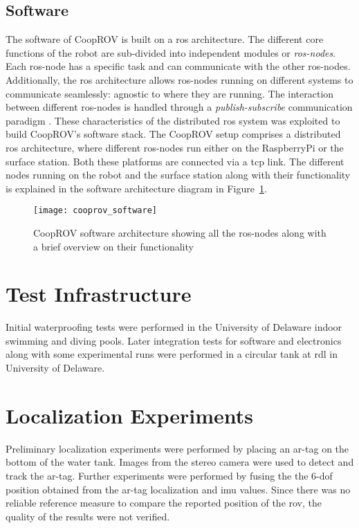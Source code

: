 \subsection{Software}

The software of CoopROV is built on a \gls{ros} architecture. The different core functions of the robot are sub-divided into independent modules or \emph{\gls{ros}-nodes}. Each \gls{ros}-node has a specific task and can communicate with the other \gls{ros}-nodes. Additionally, the \gls{ros} architecture allows \gls{ros}-nodes running on different systems to communicate seamlessly: agnostic to where they are running. The interaction between different \gls{ros}-nodes is handled through a \emph{publish-subscribe} communication paradigm \cite{eugster}. These characteristics of the distributed \gls{ros} system was exploited to build CoopROV's software stack. The CoopROV setup comprises a distributed \gls{ros} architecture, where different \gls{ros}-nodes run either on the RaspberryPi or the surface station. Both these platforms are connected via a \gls{tcp} link. The different nodes running on the robot and the surface station along with their functionality is explained in the software architecture diagram in Figure~\ref{fig:cooprov_software}.
%
\begin{figure}
  \centering
  \texttt{[image: cooprov\_software]}
  \caption[CoopROV software architecture]{CoopROV software architecture showing all the \gls{ros}-nodes along with a brief overview on their functionality}
  \label{fig:cooprov_software}
\end{figure} 


\section{Test Infrastructure}

Initial waterproofing tests were performed in the University of Delaware indoor swimming and diving pools. Later integration tests for software and electronics along with some experimental runs were performed in a circular tank at \gls{rdl} in University of Delaware.


\section{Localization Experiments}

Preliminary localization experiments were performed by placing an \gls{ar}-tag on the bottom of the water tank. Images from the stereo camera were used to detect and track the \gls{ar}-tag. Further experiments were performed by fusing the the 6-\gls{dof} position obtained from the \gls{ar}-tag localization and \gls{imu} values. Since there was no reliable reference measure to compare the reported position of the \gls{rov}, the quality of the results were not verified.


